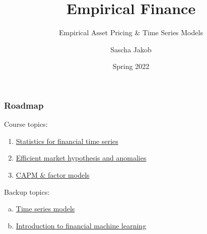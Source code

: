 \documentclass[xcolor=dvipsnames, english, 8pt]{beamer}
\title{Empirical Finance}
\subtitle{Empirical Asset Pricing \& Time Series Models}
\author{Sascha Jakob}
\institute[Institute for Financial Management]{Institute for Financial Management}
\date{Spring 2022}
\begin{document}
\begin{frame}[plain]
\maketitle
\addtocounter{page}{-1}
\end{frame}

\begin{frame}
\frametitle{Roadmap}
\setcounter{framenumber}{1}
Course topics:
    \begin{enumerate}
    	\item  \hyperlink{ret_char}{Statistics for financial time series}
    	\item  \hyperlink{EMH}{Efficient market hypothesis and anomalies}
        \item \hyperlink{CAPM}{CAPM \& factor models}
        \vspace{0.5cm}\\


	\end{enumerate}
Backup topics:
    \begin{enumerate}[a.]
           \item \hyperlink{TS}{Time series models}
        \item \hyperlink{ML}{Introduction to financial machine learning}
    \end{enumerate}
\end{frame}
\end{document}
